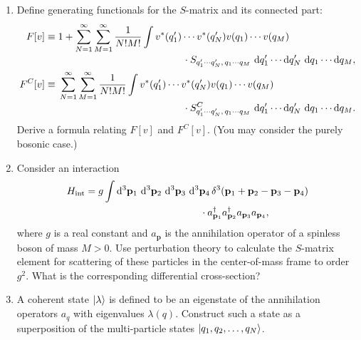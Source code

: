 

\begin{enumerate}
\item Define generating functionals for the $S$-matrix and its connected part:
\begin{align*}
  F[v] \equiv {}& 1
    + \sum_{N=1}^{\infty}\sum_{M=1}^{\infty}\frac{1}{N!M!}
      \int v^*(q'_1)\cdots v^*(q'_N)v(q_1)\cdots v(q_M)
      \\[-2pt]
    &\hspace{44mm}{}
      \cdot S_{q'_1\cdots q'_N,\,q_1\cdots q_M}
      \,\dd q'_1\cdots \dd q'_N\,\dd q_1\cdots \dd q_M, \\
  F^{C}[v] \equiv {}&
    \sum_{N=1}^{\infty}\sum_{M=1}^{\infty}\frac{1}{N!M!}
      \int v^*(q'_1)\cdots v^*(q'_N)v(q_1)\cdots v(q_M)
      \\[-2pt]
    &\hspace{44mm}{}
      \cdot S^{C}_{q'_1\cdots q'_N,\,q_1\cdots q_M}
      \,\dd q'_1\cdots \dd q'_N\,\dd q_1\cdots \dd q_M.
\end{align*}
Derive a formula relating $F[v]$ and $F^{C}[v]$. (You may consider the
purely bosonic case.)

\item Consider an interaction
\begin{align*}
  H_{\mathrm{int}} ={}& g\int \dd^3\mathbf{p}_1\,\dd^3\mathbf{p}_2\,
    \dd^3\mathbf{p}_3\,\dd^3\mathbf{p}_4\,
    \delta^3(\mathbf{p}_1+\mathbf{p}_2-\mathbf{p}_3-\mathbf{p}_4)
    \\
    &\hspace{36mm}{}
    \cdot a^{\dagger}_{\mathbf{p}_1} a^{\dagger}_{\mathbf{p}_2}
      a_{\mathbf{p}_3}a_{\mathbf{p}_4},
\end{align*}
where $g$ is a real constant and $a_{\mathbf{p}}$ is the annihilation operator
of a spinless boson of mass $M>0$. Use perturbation theory to calculate the
$S$-matrix element for scattering of these particles in the center-of-mass
frame to order $g^2$. What is the corresponding differential cross-section?

\item A coherent state $\lvert \lambda\rangle$ is defined to be an eigenstate of the
annihilation operators $a_q$ with eigenvalues $\lambda(q)$. Construct such a
state as a superposition of the multi-particle states
$\lvert q_1,q_2,\ldots,q_N\rangle$.
\end{enumerate}

